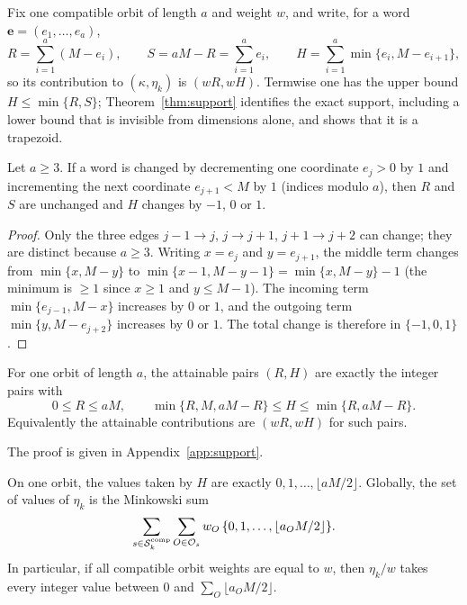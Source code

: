 Fix one compatible orbit of length $a$ and weight $w$, and write, for a word
$\mathbf{e}=(e_1,\ldots,e_a)$,
\[
R=\sum_{i=1}^{a}(M-e_i),\qquad
S=aM-R=\sum_{i=1}^{a}e_i,\qquad
H=\sum_{i=1}^{a}\min\{e_i,M-e_{i+1}\},
\]
so its contribution to $(\kappa,\eta_k)$ is $(wR,wH)$.  Termwise one has the
upper bound $H\leq\min\{R,S\}$; Theorem~\ref{thm:support} identifies the
exact support, including a lower bound that is invisible from dimensions
alone, and shows that it is a trapezoid.

\begin{lemma}\label{lem:transfer-step}
Let $a\geq3$.  If a word is changed by decrementing one coordinate $e_j>0$ by
$1$ and incrementing the next coordinate $e_{j+1}<M$ by $1$ (indices modulo
$a$), then $R$ and $S$ are unchanged and $H$ changes by $-1$, $0$ or $1$.
\end{lemma}

\begin{proof}
Only the three edges $j-1\to j$, $j\to j+1$, $j+1\to j+2$ can change; they are
distinct because $a\geq3$.  Writing $x=e_j$ and $y=e_{j+1}$, the middle term
changes from $\min\{x,M-y\}$ to $\min\{x-1,M-y-1\}=\min\{x,M-y\}-1$ (the
minimum is $\geq1$ since $x\geq1$ and $y\leq M-1$).  The incoming term
$\min\{e_{j-1},M-x\}$ increases by $0$ or $1$, and the outgoing term
$\min\{y,M-e_{j+2}\}$ increases by $0$ or $1$.  The total change is therefore
in $\{-1,0,1\}$.
\end{proof}

\begin{theorem}\label{thm:support}
For one orbit of length $a$, the attainable pairs $(R,H)$ are exactly the
integer pairs with
\begin{equation}\label{eq:trapezoid}
0\leq R\leq aM,\qquad
\min\{R,M,aM-R\}\leq H\leq\min\{R,aM-R\}.
\end{equation}
Equivalently the attainable contributions are $(wR,wH)$ for such pairs.
\end{theorem}

\noindent The proof is given in Appendix~\ref{app:support}.



\begin{corollary}\label{cor:hull-values}
On one orbit, the values taken by $H$ are exactly
$0,1,\ldots,\lfloor aM/2\rfloor$.  Globally, the set of values of $\eta_k$ is
the Minkowski sum
\[
\sum_{s\in\mathcal{S}_k^{\mathrm{comp}}}\sum_{O\in\mathcal O_s}
 w_O\,\{0,1,\ldots,\lfloor a_OM/2\rfloor\}.
\]
In particular, if all compatible orbit weights are equal to $w$, then
$\eta_k/w$ takes every integer value between $0$ and
$\sum_O\lfloor a_OM/2\rfloor$.
\end{corollary}

